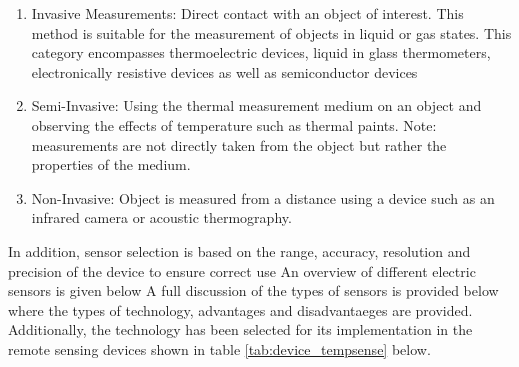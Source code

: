 \begin{enumerate}
	\item Invasive Measurements: Direct contact with an object of interest. This method is suitable for the measurement of objects in liquid or gas states. This category encompasses thermoelectric devices, liquid in glass thermometers, electronically resistive devices as well as semiconductor devices \cite{mansoor2015silicon}
	\item Semi-Invasive: Using the thermal measurement medium on an object and observing the effects of temperature such as thermal paints. Note: measurements are not directly taken from the object but rather the properties of the medium.
	\item Non-Invasive: Object is measured from a distance using a device such as an infrared camera or acoustic thermography.
\end{enumerate}

In addition, sensor selection is based on the range, accuracy, resolution and precision of the device to ensure correct use An overview of different electric sensors is given below \cite{childs2000review} A full discussion of the types of sensors is provided below where the types of technology, advantages and disadvantaeges are provided. Additionally, the technology has been selected for its implementation in the remote sensing devices shown in table \ref{tab:device_tempsense} below.
 
\begin{table}[H]
	\centering
	\caption{Comparison of the different components used by each device for temperature measurement as well as the . Each device measures temperature of a different process. For example:  the WIIB measure air temperature whereas a device like the SIMB measures temperature profiles of ice floes in addition to air temperature.}
	\label{tab:device_tempsense}
	\setlength{\extrarowheight}{5pt}
\end{table}

